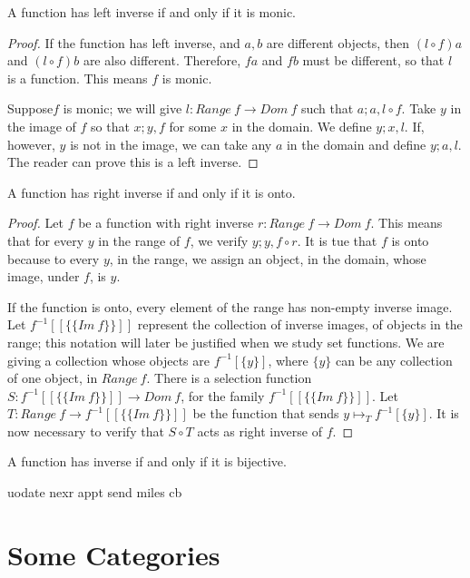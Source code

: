 \documentclass [12pt]{book}
\begin{document}
\begin{lemma f1}A function has left inverse if and only if it is monic.\end{lemma f1}

\begin{proof}If the function has left inverse, and $a,b$ are different objects, then $(l\circ f)a$ and $(l\circ f)b$ are also different. Therefore, $fa$ and $fb$ must be different, so that $l$ is a function. This means $f$ is monic.

Suppose$f$ is monic; we will give $l:Range~f\rightarrow Dom~f$ such that $a;a,l\circ f$. Take $y$ in the image of $f$ so that $x;y,f$ for some $x$ in the domain. We define $y;x,l$. If, however, $y$ is not in the image, we can take any $a$ in the domain and define $y;a,l$. The reader can prove this is a left inverse.\end{proof}

\begin{lemma f2}A function has right inverse if and only if it is onto.\end{lemma f2}

\begin{proof}Let $f$ be a function with right inverse $r:Range~f\rightarrow Dom~f$. This means that for every $y$ in the range of $f$, we verify $y;y,f\circ r$. It is tue that $f$ is onto because to every $y$, in the range, we assign an object, in the domain, whose image, under $f$, is $y$. 

If the function is onto, every element of the range has non-empty inverse image. Let $f^{-1}[[\{\{Im~f\}\}]]$ represent the collection of inverse images, of objects in the range; this notation will later be justified when we study set functions. We are giving a collection whose objects are $f^{-1}[\{y\}]$, where $\{y\}$ can be any collection of one object, in $Range~f$. There is a selection function $S:f^{-1}[[\{\{Im~f\}\}]]\rightarrow Dom~f$, for the family $f^{-1}[[\{\{Im~f\}\}]]$. Let $T:Range~f\rightarrow f^{-1}[[\{\{Im~f\}\}]]$ be the function that sends $y\mapsto_Tf^{-1}[\{y\}]$. It is now necessary to verify that $S\circ T$ acts as right inverse of $f$.\end{proof}

\begin{theorem}\label{th bij}A function has inverse if and only if it is bijective.\end{theorem}

uodate nexr appt send miles cb

	\section{Some Categories}
\end{document}

